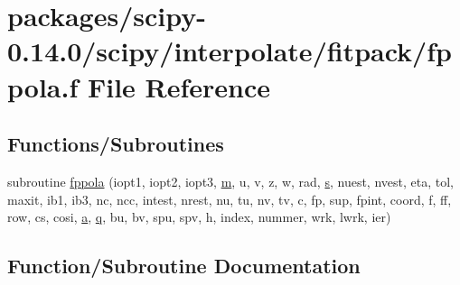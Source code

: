 \hypertarget{fppola_8f}{}\section{packages/scipy-\/0.14.0/scipy/interpolate/fitpack/fppola.f File Reference}
\label{fppola_8f}
\subsection*{Functions/\+Subroutines}
\begin{DoxyCompactItemize}
\item 
subroutine \hyperlink{fppola_8f_a0a75676271364d135517cefe4bad1663}{fppola} (iopt1, iopt2, iopt3, \hyperlink{indexexpr_8h_ab72fdb4031d47b75ab26dd18a437bcdc}{m}, u, v, z, w, rad, \hyperlink{indexexpr_8h_ae024b0db549122b44c349ae28ec990dc}{s}, nuest, nvest, eta, tol, maxit, ib1, ib3, nc, ncc, intest, nrest, nu, tu, nv, tv, c, fp, sup, fpint, coord, f, ff, row, cs, cosi, \hyperlink{gen__mat5files_8m_aae328bf20413f220e38aec4d95bfd6da}{a}, \hyperlink{indexexpr_8h_ac886c3584e464b5533390d7440c9dd98}{q}, bu, bv, spu, spv, h, index, nummer, wrk, lwrk, ier)
\end{DoxyCompactItemize}


\subsection{Function/\+Subroutine Documentation}
\hypertarget{fppola_8f_a0a75676271364d135517cefe4bad1663}{}
